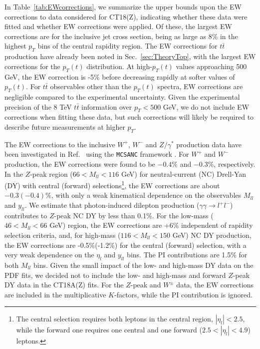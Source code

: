 In Table~\ref{tab:EWcorrections}, we summarize the upper bounds upon the EW 
corrections to data considered for CT18(Z), indicating whether these data were
fitted and whether EW corrections were applied. Of these, the largest EW
corrections are for the inclusive jet cross section, being as large as 8\% in
the highest $p_{T}$ bins of the central rapidity region. 
The EW corrections for $t\bar{t}$ production have already been noted in 
Sec.~\ref{sec:TheoryTop}, with the largest EW corrections for the $p_{T}(t)$ 
distribution. At high-$p_{T}(t)$ values approaching 500 GeV, the EW correction is 
-5\% before decreasing rapidly at softer values of $p_{T}(t)$. 
For $t\bar{t}$ observables other than the $p_{T}(t)$ spectra, EW corrections are
negligible compared to the experimental uncertainty. Given the experimental precision of
the 8 TeV $t\bar{t}$ information over $p_T\! <\! 500$ GeV, we do not include EW corrections
when fitting these data, but such corrections will likely be required to describe future
measurements at higher $p_T$.

The EW corrections to the inclusive $W^+$, $W^-$ and $Z/\gamma^*$ 
production data have been investigated in Ref.~\cite{Aaboud:2016btc} 
using the \texttt{MCSANC} framework \cite{Arbuzov:2015yja}. 
For $W^{+}$ and $W^{-}$ production, the
EW corrections were found to be $-0.4$\% and $-0.3$\%, respectively. 
In the $Z$-peak region ($66\!<\!M_{ll}\!<\!116$ GeV) for neutral-current (NC)
Drell-Yan (DY) with central (forward) selections\footnote{The central selection requires both leptons in the central region, $|\eta_l|<2.5$, while the forward one requires one central and one forward ($2.5<|\eta_l|<4.9$) leptons.}, the EW 
corrections are about $-0.3(-0.4)\%$, with only a weak kinematical dependence 
on the observables $M_{ll}$ and $y_{ll}$. We estimate that photon-induced dilepton
production ($\gamma\gamma\to l^{+}l^{-}$) contributes to $Z$-peak NC DY 
by less than 0.1\%. For the low-mass ($46\!<\!M_{ll}\!<\!66$ GeV) region, the EW corrections 
are +6\% independent of rapidity selection criteria, and, for high-mass ($116\!<\!M_{ll}\!<\!150$ GeV) NC DY production, the EW corrections are -0.5\%(-1.2\%) for the central (forward) selection, with a very weak dependence on the $\eta_l$ and $y_{ll}$ bins. The PI contributions are 1.5\% for both $M_{ll}$ bins.
%
%
%
%
Given the small impact of the low- and high-mass DY data on the PDF fits, we decided not to 
include the low- and high-mass and forward $Z$-peak DY data in the CT18A(Z) fits. 
For the $Z$-peak and $W^\pm$ data, the EW corrections are included in the multiplicative $K$-factors, while the PI contribution is ignored.

